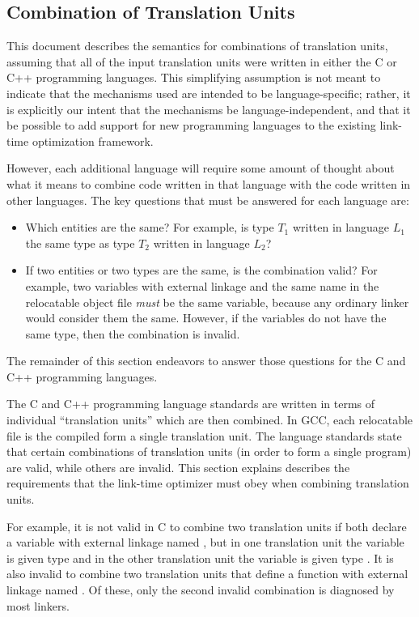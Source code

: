 \subsection{Combination of Translation Units}

This document describes the semantics for combinations of translation
units, assuming that all of the input translation units were written
in either the C or C++ programming languages.  This simplifying
assumption is not meant to indicate that the mechanisms used are
intended to be language-specific; rather, it is explicitly our intent
that the mechanisms be language-independent, and that it be possible
to add support for new programming languages to the existing link-time
optimization framework.  

However, each additional language will require some amount of thought
about what it means to combine code written in that language with the
code written in other languages.  The key questions that must be
answered for each language are:
\begin{itemize}
\item Which entities are the same?  For example, is type $T_1$ written
  in language $L_1$ the same type as type $T_2$ written in language
  $L_2$?
\item If two entities or two types are the same, is the combination
  valid?  For example, two variables with external linkage and the
  same name in the relocatable object file \emph{must} be the same
  variable, because any ordinary linker would consider them the same.
  However, if the variables do not have the same type, then the
  combination is invalid.
\end{itemize}
The remainder of this section endeavors to answer those questions for
the C and C++ programming languages.

The C and C++ programming language standards are written in terms of
individual ``translation units'' which are then combined.  In GCC,
each relocatable file is the compiled form a single translation
unit.  The language standards state that certain combinations of
translation units (in order to form a single program) are valid, while
others are invalid.  This section explains describes the requirements
that the link-time optimizer must obey when combining translation
units.

For example, it is not valid in C to combine two translation units if
both declare a variable with external linkage named , but in
one translation unit the variable is given type  and in the
other translation unit the variable is given type .  It
is also invalid to combine two translation units that define a
function with external linkage named .  Of these, only the
second invalid combination is diagnosed by most linkers.

